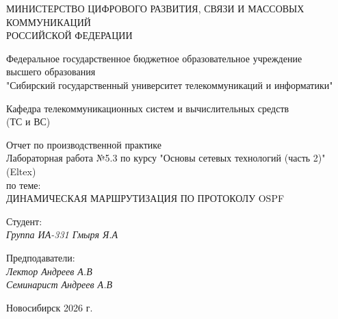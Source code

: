 \thispagestyle{empty}

\begin{center}
    МИНИСТЕРСТВО ЦИФРОВОГО РАЗВИТИЯ, СВЯЗИ И МАССОВЫХ КОММУНИКАЦИЙ \\ РОССИЙСКОЙ ФЕДЕРАЦИИ

    \vspace{20pt}

    Федеральное государственное бюджетное образовательное учреждение  \\  высшего образования \\
    "Сибирский государственный университет телекоммуникаций и информатики" \\

    \vspace{20pt}

    Кафедра телекоммуникационных систем и вычислительных средств \\  (ТС и ВС)
\end{center}

\vfill

\begin{center}
    Отчет по производственной практике \\  
    Лабораторная работа №5.3 по курсу "Основы сетевых технологий (часть 2)" (Eltex) \\
    \vspace{20pt}
    по теме: \\
    \uppercase{Динамическая маршрутизация по протоколу OSPF}
\end{center}

\vfill

    \noindent Студент: \\
    \textit{Группа ИА-331 \hfill Гмыря Я.А} 

    \vspace{20pt}
 
    \noindent Предподаватели: \\
    \textit{Лектор \hfill Андреев А.В} \\
    \textit{Семинарист \hfill Андреев А.В}

\vfill

\begin{center}
    Новосибирск 2026 г.
\end{center}